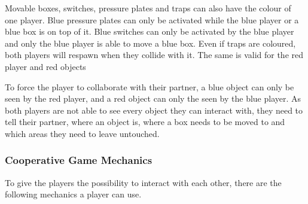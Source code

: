 Movable boxes, switches, pressure plates and traps can also have the colour of one player. 
Blue pressure plates can only be activated while the blue player or a blue box is on top of it.
Blue switches can only be activated by the blue player and only the blue player is able to move a blue box.
Even if traps are coloured, both players will respawn when they collide with it.
The same is valid for the red player and red objects

To force the player to collaborate with their partner, a blue object can only be seen by the red player, and a red object can only the seen by the blue player. As both players are not able to see every object they can interact with, they need to tell their partner, where an object is, where a box needs to be moved to and which areas they need to leave untouched.

\subsubsection{Cooperative Game Mechanics}
\label{Cooperative game mechanics}

To give the players the possibility to interact with each other, there are the following mechanics a player can use.


